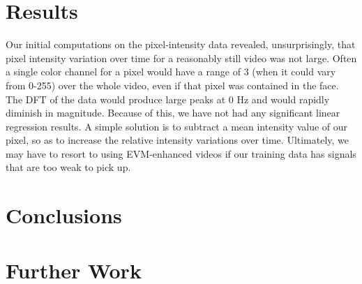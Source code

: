 \documentclass[12pt]{article}
\begin{document}
  


\section{Results}
  Our initial computations on the pixel-intensity data revealed, unsurprisingly,
  that pixel intensity variation over time for a reasonably still video was not large.
  Often a single color channel for a pixel would have a range of 3 (when it could vary from 0-255) over the whole video, even if that pixel was contained in the face.
  The DFT of the data would produce large peaks at 0 Hz and would rapidly diminish in magnitude. Because of this, we have not had any significant linear regression results.
  A simple solution is to subtract a mean intensity value of our pixel, so as to increase the relative intensity variations over time.
  Ultimately, we may have to resort to using EVM-enhanced videos if our training data has signals that are too weak to pick up.
  
  
 \section{Conclusions}
 
 \section{Further Work}
 

  
\end{document}
